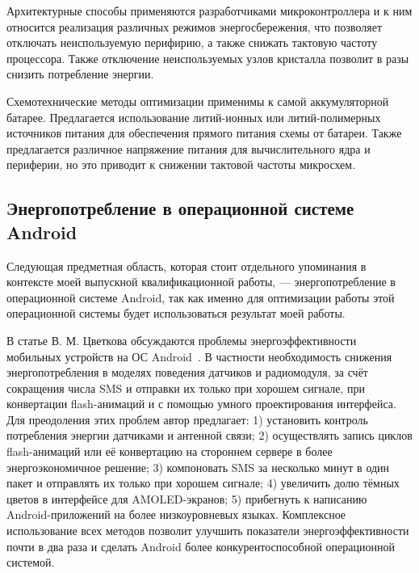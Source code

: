 \documentclass[a4paper,14pt]{extarticle} %
\begin{document}
	Архитектурные способы применяются разработчиками микроконтроллера и к ним относится реализация различных режимов энергосбережения, что позволяет отключать неиспользуемую перифирию, а также снижать тактовую частоту процессора. Также отключение неиспользуемых узлов кристалла позволит в разы снизить потребление энергии.
	
	Схемотехнические методы оптимизации применимы к самой аккумуляторной батарее. Предлагается использование литий-ионных или литий-полимерных источников питания для обеспечения прямого питания схемы от батареи. Также предлагается различное напряжение питания для вычислительного ядра и периферии, но это приводит к снижении тактовой частоты микросхем.
	
	
	\subsection{Энергопотребление в операционной системе Android}

	Следующая предметная область, которая стоит отдельного упоминания в контексте моей выпускной квалификационной работы, — энергопотребление в операционной системе Android, так как именно для оптимизации работы этой операционной системы будет использоваться результат моей работы.
	
	В статье В. М. Цветкова обсуждаются проблемы энергоэффективности мобильных устройств на ОС Android~\parencite{цветков2014энергоэффективность}. В частности необходимость снижения энергопотребления в моделях поведения датчиков и радиомодуля, за счёт сокращения числа SMS и отправки их только при хорошем сигнале, при конвертации flash-анимаций и с помощью умного проектирования интерфейса. Для преодоления этих проблем автор предлагает: 1) установить контроль потребления энергии датчиками и антенной связи; 2) осуществлять запись циклов flash-анимаций или её конвертацию на стороннем сервере в более энергоэкономичное решение; 3) компоновать SMS за несколько минут в один пакет и отправлять их только при хорошем сигнале; 4) увеличить долю тёмных цветов в интерфейсе для AMOLED-экранов; 5) прибегнуть к написанию Android-приложений на более низкоуровневых языках. Комплексное использование всех методов позволит улучшить показатели энергоэффективности почти в два раза и сделать Android более конкурентоспособной операционной системой.
	
\end{document}
